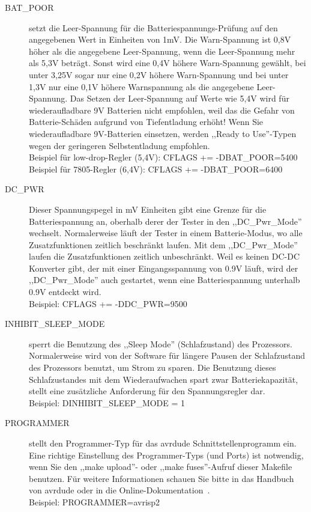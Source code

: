 \begin{description}
  \item[BAT\_POOR] setzt die Leer-Spannung für die Batteriespannungs-Prüfung auf den angegebenen Wert in Einheiten von 1mV.
Die Warn-Spannung ist 0,8V höher als die angegebene Leer-Spannung, wenn die Leer-Spannung mehr als 5,3V beträgt.
Sonst wird eine 0,4V höhere Warn-Spannung gewählt, bei unter 3,25V sogar nur eine 0,2V höhere Warn-Spannung und
bei unter 1,3V nur eine 0,1V höhere Warnspannung als die angegebene Leer-Spannung.
Das Setzen der Leer-Spannung auf Werte wie 5,4V wird für wiederaufladbare 9V Batterien nicht empfohlen,
weil das die Gefahr von Batterie-Schäden aufgrund von Tiefentladung erhöht!
Wenn Sie wiederaufladbare 9V-Batterien einsetzen, werden ,,Ready to Use''-Typen wegen der geringeren Selbstentladung empfohlen.\\
Beispiel für low-drop-Regler (5,4V): CFLAGS += -DBAT\_POOR=5400 \\
Beispiel für 7805-Regler (6,4V): CFLAGS += -DBAT\_POOR=6400

  \item[DC\_PWR] Dieser Spannungspegel in mV Einheiten gibt eine Grenze für die Batteriespannung an, oberhalb
derer der Tester in den ,,DC\_Pwr\_Mode'' wechselt. Normalerweise läuft der Tester in einem Batterie-Modus,
wo alle Zusatzfunktionen zeitlich beschränkt laufen.
Mit dem ,,DC\_Pwr\_Mode'' laufen die Zusatzfunktionen zeitlich unbeschränkt.
Weil es keinen DC-DC Konverter gibt, der mit einer Eingangsspannung von 0.9V läuft,
wird der ,,DC\_Pwr\_Mode'' auch gestartet, wenn eine Batteriespannung unterhalb 0.9V entdeckt wird.\\
Beispiel: CFLAGS += -DDC\_PWR=9500

  \item[INHIBIT\_SLEEP\_MODE] sperrt die Benutzung des ,,Sleep Mode'' (Schlafzustand) des Prozessors.
Normalerweise wird von der Software für längere Pausen der Schlafzustand des Prozessors benutzt, um Strom zu sparen.
Die Benutzung dieses Schlafzustandes mit dem Wiederaufwachen spart zwar Batteriekapazität, 
stellt eine zusätzliche Anforderung für den Spannungsregler dar.\\
Beispiel: DINHIBIT\_SLEEP\_MODE = 1

  \item[PROGRAMMER] stellt den Programmer-Typ für das avrdude Schnittstellenprogramm ein.
Eine richtige Einstellung des Programmer-Typs (und Ports) ist notwendig, wenn Sie den ,,make upload''- oder
,,make fuses''-Aufruf dieser Makefile benutzen.
Für weitere Informationen schauen Sie bitte in das Handbuch von avrdude oder in die Online-Dokumentation~\cite{avrdude}.\\
Beispiel: PROGRAMMER=avrisp2


\end{description}
